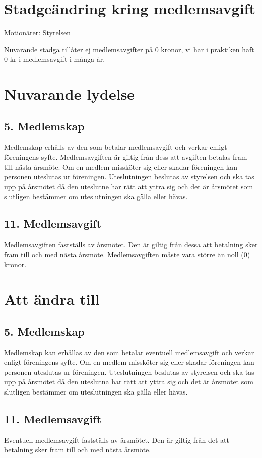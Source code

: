 \documentclass[a4paper,11pt,oneside]{article}
\begin{document}
\section*{Stadgeändring kring medlemsavgift}

Motionärer: Styrelsen

Nuvarande stadga tillåter ej medlemsavgifter på 0 kronor, vi har i praktiken haft 0 kr i medlemsavgift i många år.

\section*{Nuvarande lydelse}
\subsection*{5. Medlemskap}
Medlemskap erhålls av den som betalar medlemsavgift och verkar enligt föreningens syfte. Medlemsavgiften är giltig från dess att avgiften betalas fram till nästa årsmöte. Om en medlem missköter sig eller skadar föreningen kan personen uteslutas ur föreningen. Uteslutningen beslutas av styrelsen och ska tas upp på årsmötet då den uteslutne har rätt att yttra sig och det är årsmötet som slutligen bestämmer om uteslutningen ska gälla eller hävas.

\subsection*{11. Medlemsavgift}
Medlemsavgiften fastställs av årsmötet. Den är giltig från dessa att betalning sker fram till och med nästa årsmöte. Medlemsavgiften måste vara större än noll (0) kronor.

\section*{Att ändra till}
\subsection*{5. Medlemskap}
Medlemskap kan erhållas av den som betalar eventuell medlemsavgift och verkar enligt föreningens syfte. Om en medlem missköter sig eller skadar föreningen kan personen uteslutas ur föreningen. Uteslutningen beslutas av styrelsen och ska tas upp på årsmötet då den uteslutna har rätt att yttra sig och det är årsmötet som slutligen bestämmer om uteslutningen ska gälla eller hävas.

\subsection*{11. Medlemsavgift}
Eventuell medlemsavgift fastställs av årsmötet. Den är giltig från det att betalning sker fram till och med nästa årsmöte.
\end{document}
